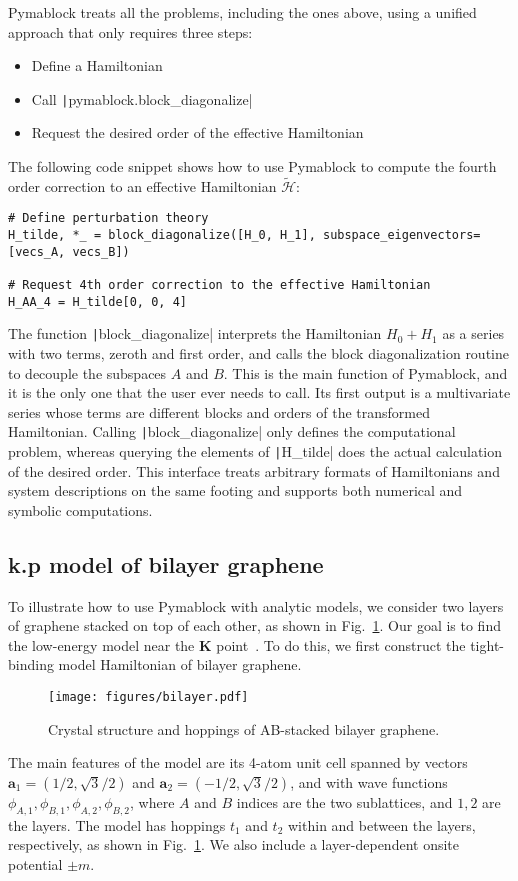 Pymablock treats all the problems, including the ones above, using a unified approach that only requires three steps:
%
\begin{itemize}
\item Define a Hamiltonian
\item Call \texttt|pymablock.block_diagonalize|
\item Request the desired order of the effective Hamiltonian
\end{itemize}
%
The following code snippet shows how to use Pymablock to compute the fourth order correction to an effective Hamiltonian $\tilde{\mathcal{H}}$:
%
\begin{verbatim}
# Define perturbation theory
H_tilde, *_ = block_diagonalize([H_0, H_1], subspace_eigenvectors=[vecs_A, vecs_B])

# Request 4th order correction to the effective Hamiltonian
H_AA_4 = H_tilde[0, 0, 4]
\end{verbatim}
%
The function \texttt|block_diagonalize| interprets the Hamiltonian $H_0 + H_1$ as a series with two terms, zeroth and first order, and calls the block diagonalization routine to decouple the subspaces $A$ and $B$.
This is the main function of Pymablock, and it is the only one that the user ever needs to call.
Its first output is a multivariate series whose terms are different blocks and orders of the transformed Hamiltonian.
Calling \texttt|block_diagonalize| only defines the computational problem, whereas querying the elements of \texttt|H_tilde| does the actual calculation of the desired order.
This interface treats arbitrary formats of Hamiltonians and system descriptions on the same footing and supports both numerical and symbolic computations.

\subsection{k.p model of bilayer graphene}
\label{sec:bilayer_graphene}

To illustrate how to use Pymablock with analytic models, we consider two layers of graphene stacked on top of each other, as shown in Fig.~\ref{fig:bilayer}.
Our goal is to find the low-energy model near the $\mathbf{K}$ point~\cite{McCann_2013}.
To do this, we first construct the tight-binding model Hamiltonian of bilayer graphene.
%
\begin{figure}[!htbp]
\centering
\texttt{[image: figures/bilayer.pdf]}
\caption[]{Crystal structure and hoppings of AB-stacked bilayer graphene.}
\label{fig:bilayer}
\end{figure}
%
The main features of the model are its 4-atom unit cell spanned by vectors $\mathbf{a}_1 = (1/2, \sqrt{3}/2)$ and $\mathbf{a}_2=( -1/2, \sqrt{3}/2)$, and with wave functions $\phi_{A,1}, \phi_{B,1}, \phi_{A,2}, \phi_{B,2}$, where $A$ and $B$ indices are the two sublattices, and $1,2$ are the layers.
The model has hoppings $t_1$ and $t_2$ within and between the layers, respectively, as shown in Fig.~\ref{fig:bilayer}.
We also include a layer-dependent onsite potential $\pm m$.

